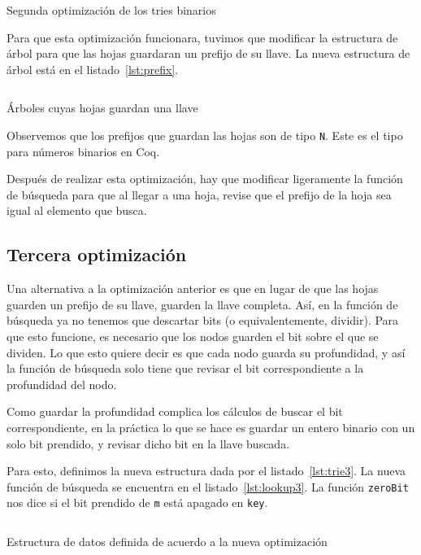 \documentclass[11pt,letterpaper]{article}
\begin{document}
\begin{listing}[H]
  \inputminted{coq}{src/smart2.v}
  \caption{Segunda optimización de los tries binarios}
  \label{lst:opt2}
\end{listing}

Para que esta optimización funcionara, tuvimos que modificar la estructura de árbol para que las hojas guardaran un prefijo de su llave. La nueva estructura de árbol está en el listado~\ref{lst:prefix}.

\begin{listing}[H]
  \inputminted{coq}{src/prefix.v}
  \caption{Árboles cuyas hojas guardan una llave}
  \label{lst:prefix}
\end{listing}

Observemos que los prefijos que guardan las hojas son de tipo \texttt{N}. Este es el tipo para números binarios en Coq.

Después de realizar esta optimización, hay que modificar ligeramente la función de búsqueda para que al llegar a una hoja, revise que el prefijo de la hoja sea igual al elemento que busca.

\subsection{Tercera optimización}

\noindent Una alternativa a la optimización anterior es que en lugar de que las hojas guarden un prefijo de su llave, guarden la llave completa. Así, en la función de búsqueda ya no tenemos que descartar bits (o equivalentemente, dividir). Para que esto funcione, es necesario que los nodos guarden el bit sobre el que se dividen. Lo que esto quiere decir es que cada nodo guarda su profundidad, y así la función de búsqueda solo tiene que revisar el bit correspondiente a la profundidad del nodo.

Como guardar la profundidad complica los cálculos de buscar el bit correspondiente, en la práctica lo que se hace es guardar un entero binario con un solo bit prendido, y revisar dicho bit en la llave buscada.

Para esto, definimos la nueva estructura dada por el listado~\ref{lst:trie3}. La nueva función de búsqueda se encuentra en el listado~\ref{lst:lookup3}. La función \texttt{zeroBit} nos dice si el bit prendido de \texttt{m} está apagado en \texttt{key}.

\begin{listing}[H]
  \inputminted{coq}{src/trie3.v}
  \caption{Estructura de datos definida de acuerdo a la nueva optimización}
  \label{lst:trie3}
\end{listing}
\end{document}
